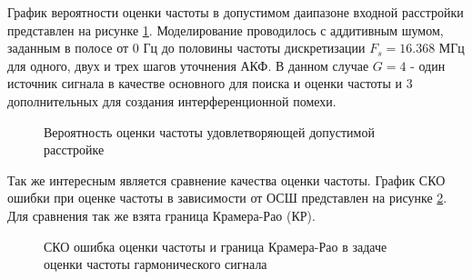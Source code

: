 График вероятности оценки частоты в допустимом даипазоне входной расстройки представлен на рисунке
\ref{pic:ar_dma_probability}. Моделирование проводилось с аддитивным шумом, заданным в полосе от 0 Гц до
половины частоты дискретизации ${F_s=16.368}$ МГц для одного, двух и трех шагов уточнения АКФ. В данном случае ${G=4}$ - 
один источник сигнала в качестве основного для поиска и оценки частоты и 3 дополнительных для создания интерференционной помехи.
\begin{figure}[H]
\center{}
	\caption{Вероятность оценки частоты удовлетворяющей допустимой расстройке}
	\label{pic:ar_dma_probability}
\end{figure}


Так же интересным является сравнение качества оценки частоты. График СКО ошибки при оценке частоты в зависимости
от ОСШ представлен на рисунке \ref{pic:crlb_vs_snr}. Для сравнения так же взята граница Крамера-Рао (КР).
\begin{figure}[H]
\center{}
	\caption{СКО ошибка оценки частоты и граница Крамера-Рао в задаче оценки частоты гармонического сигнала}
	\label{pic:crlb_vs_snr}
\end{figure}

\newpage
